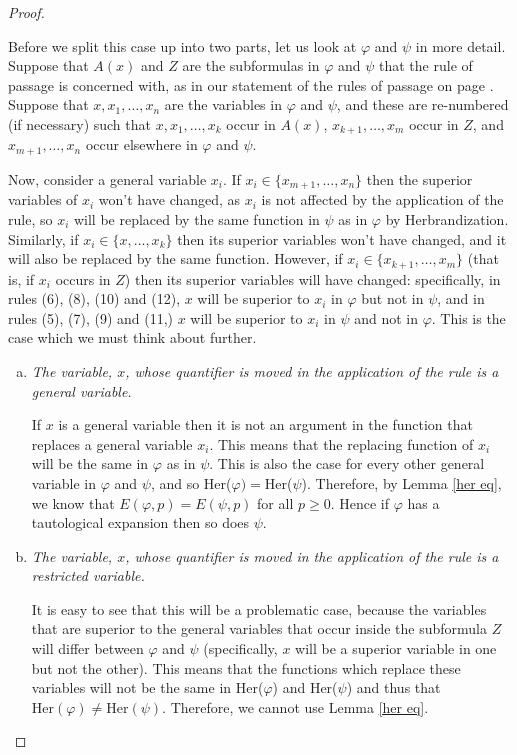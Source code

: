 \documentclass[a4paper,12pt]{report}
\theoremstyle{definition}
\begin{document}
\begin{proof}
\begin{enumerate}[(i)]
Before we split this case up into two parts, let us look at $\varphi$ and $\psi$ in more detail. Suppose that $A(x)$ and $Z$ are the subformulas in $\varphi$ and $\psi$ that the rule of passage is concerned with, as in our statement of the rules of passage on page \pageref{rulesofpassage}. Suppose that $x , x_1 , \ldots , x_n$ are the variables in $\varphi$ and $\psi$, and these are re-numbered (if necessary) such that $x , x_1 , \ldots , x_k$ occur in $A(x)$, $x_{k+1} , \ldots , x_m$ occur in $Z$, and $x_{m+1} , \ldots , x_n$ occur elsewhere in $\varphi$ and $\psi$.

Now, consider a general variable $x_i$. If $x_i \in \{ x_{m+1} , \ldots , x_n \}$ then the superior variables of $x_i$ won't have changed, as $x_i$ is not affected by the application of the rule, so $x_i$ will be replaced by the same function in $\psi$ as in $\varphi$ by Herbrandization. Similarly, if $x_i \in \{ x , \ldots , x_k \}$ then its superior variables won't have changed, and it will also be replaced by the same function. However, if $x_i \in \{ x_{k+1} , \ldots , x_m \}$ (that is, if $x_i$ occurs in $Z$) then its superior variables will have changed: specifically, in rules (6), (8), (10) and (12), $x$ will be superior to $x_i$ in $\varphi$ but not in $\psi$, and in rules (5), (7), (9) and (11,) $x$ will be superior to $x_i$ in $\psi$ and not in $\varphi$. This is the case which we must think about further.

\begin{enumerate}[(a)]
\item \emph{The variable, $x$, whose quantifier is moved in the application of the rule is a general variable.}

If $x$ is a general variable then it is not an argument in the function that replaces a general variable $x_i$. This means that the replacing function of $x_i$ will be the same in $\varphi$ as in $\psi$. This is also the case for every other general variable in $\varphi$ and $\psi$, and so Her($\varphi) = $Her($\psi$). Therefore, by Lemma \ref{her eq}, we know that $E(\varphi, p) = E(\psi, p)$ for all $p \ge 0$. Hence if $\varphi$ has a tautological expansion then so does $\psi$.  

\item \emph{The variable, $x$, whose quantifier is moved in the application of the rule is a restricted variable.}

It is easy to see that this will be a problematic case, because the variables that are superior to the general variables that occur inside the subformula $Z$ will differ between $\varphi$ and $\psi$ (specifically, $x$ will be a superior variable in one but not the other). This means that the functions which replace these variables will not be the same in Her($\varphi$) and Her($\psi$) and thus that $\mbox{Her}(\varphi) \neq \mbox{Her}(\psi)$. Therefore, we cannot use Lemma \ref{her eq}.


\end{enumerate}
\end{enumerate}
\end{proof}
\end{document}
